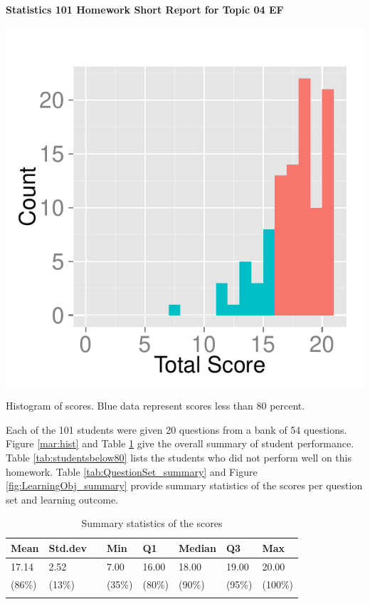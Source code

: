 \documentclass[12pt,english,nohyper]{tufte-handout}\usepackage[]{graphicx}\usepackage[]{color}
\begin{document}
\centerline{\Large\bf Statistics 101 Homework Short Report for Topic 04 EF}
\vspace{1cm}

\begin{marginfigure}
\includegraphics[width=0.98\linewidth]{Topic04_EF_score}
\caption{\label{mar:hist}Histogram of scores. Blue data represent scores less than 80 percent.}
\end{marginfigure}

Each of the 101 students were given 20 questions from a bank of 54 questions. Figure \ref{mar:hist} and Table \ref{tab:summary} give the overall summary of student performance. Table \ref{tab:studentsbelow80} lists the students who did not perform well on this homework. Table \ref{tab:QuestionSet_summary} and Figure \ref{fig:LearningObj_summary} provide summary statistics of the scores per question set and learning outcome.
\bigskip{}

\begin{longtable}{llllllll}
  \hline
Mean & Std.dev &   & Min & Q1 & Median & Q3 & Max \\ 
  \hline
17.14 & 2.52 &  & 7.00 & 16.00 & 18.00 & 19.00 & 20.00 \\ 
  (86\%) & (13\%) &  & (35\%) & (80\%) & (90\%) & (95\%) & (100\%) \\ 
   \hline
\hline
\caption{Summary statistics of the scores} 
\label{tab:summary}
\end{longtable}
\end{document}
